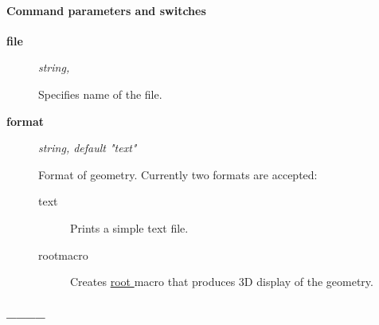 \paragraph{ Command parameters and switches }
\begin{description}
	\item[\textbf{ file }] \textit{ string, }

 Specifies name of the file.   
	\item[\textbf{ format }] \textit{ string, default "text"}

 Format of geometry. Currently two formats are accepted:       
\begin{description}
	\item[ text ] 

 Prints a simple text file.           
	\item[ rootmacro ] 

 Creates \href{http://root.cern.ch}{ root } macro that produces 3D display of the geometry.           
\end{description}
\end{description}

\paragraph{ \_\_\_\_  }



% 
% 
% 
% 


